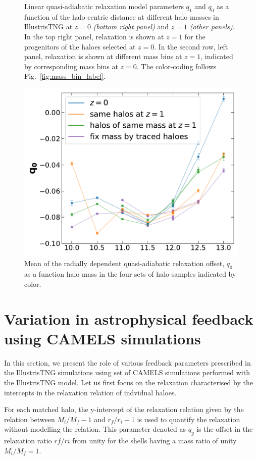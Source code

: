 \begin{figure}[htbp]
\caption{Linear quasi-adiabatic relaxation model parameters $q_1$ and $q_0$ as a function of the halo-centric distance at different halo masses in IllustrisTNG at $z=0$ \emph{(bottom right panel)} and $z=1$ \emph{(other panels)}. In the top right panel, relaxation is shown at $z=1$ for the progenitors of the haloes selected at $z=0$. In the second row, left panel, relaxation is shown at different mass bins at $z=1$, indicated by corresponding mass bins at $z=0$. The color-coding follows Fig.~\ref{fig:mass_bin_label}.}
\label{fig:rf-fit-params}
\end{figure}

\begin{figure}[htbp]
\centering
\includegraphics[width=0.6\linewidth]{plots/fit_param_q0_M_T_z01.pdf}
\caption{Mean of the radially dependent quasi-adiabatic relaxation offset, $q_{0}$ as a function halo mass in the four sets of halo samples indicated by color.}
\label{fig:fit-fit-func-q}
\end{figure}










\section{Variation in astrophysical feedback using CAMELS simulations}
\label{sec:res-physvar-CAMELS}
In this section, we present the role of various feedback parameters prescribed in the IllustrisTNG simulations using set of CAMELS simulations performed with the IllustrisTNG model. Let us first focus on the relaxation characterised by the intercepts in the relaxation relation of indvidual haloes. 

For each matched halo, the y-intercept of the relaxation relation given by the relation between $M_i/M_f-1$ and $r_f/r_i-1$ is used to quantify the relaxation without modelling the relation. This parameter denoted as $q_y$ is the offset in the relaxation ratio $rf/ri$ from unity for the shells having a mass ratio of unity $M_i/M_f=1$. 

